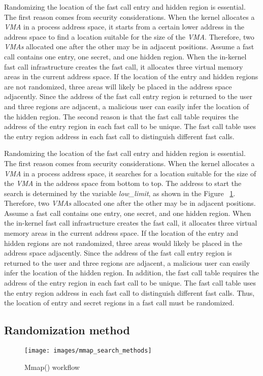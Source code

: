 Randomizing the location of the fast call entry and hidden region is essential. 
The first reason comes from security considerations. 
When the kernel allocates a \emph{VMA} in a process address space, it starts from a 
certain lower address in the address space to find a location suitable for the 
size of the \emph{VMA}. Therefore, two \emph{VMAs}  allocated one after the other may be in adjacent 
positions. Assume a fast call contains one entry, one secret, and one hidden region. 
When the in-kernel fast call infrastructure creates the fast call, it allocates three 
virtual memory areas in the current address space. If the location of the entry and hidden 
regions are not randomized, three areas will likely be placed in the address space adjacently. 
Since the address of the fast call entry region is returned to the user and three regions are 
adjacent, a malicious user can easily infer the location of the hidden region. The second reason 
is that the fast call table requires the address of the entry region in each fast call to be unique. 
The fast call table uses the entry region address in each fast call to distinguish different fast calls.


Randomizing the location of the fast call entry and hidden region is essential. 
The first reason comes from security considerations. 
When the kernel allocates a \emph{VMA} in a process address space,  it searches 
for a location suitable for the size of the \emph{VMA} in the address space from 
bottom to top. The address to start the search is determined by the variable 
\emph{low\_limit}, as shown in the Figure ~\ref{fig:mmap_search_methods}. Therefore, two \emph{VMAs} 
allocated one after the 
other may be in adjacent positions. Assume a fast call contains one entry, one secret, 
and one hidden region. When the in-kernel fast call infrastructure creates the fast call, 
it allocates three virtual memory areas in the current address space. If the location of 
the entry and hidden regions are not randomized, three areas would likely be placed in the 
address space adjacently. Since the address of the fast call entry region is returned to the 
user and three regions are adjacent, a malicious user can easily infer the location of the 
hidden region. In addition, the fast call table requires the address of the entry region in 
each fast call to be unique. The fast call table uses the entry region address in each fast 
call to distinguish different fast calls. Thus, the location of entry and secret regions in a 
fast call must be randomized.
\subsection{Randomization method}
\begin{figure}[tbp]
  \centering
  \texttt{[image: images/mmap\_search\_methods]}
  \caption[Short description]{Mmap() workflow}
  \label{fig:mmap_search_methods}
\end{figure}



